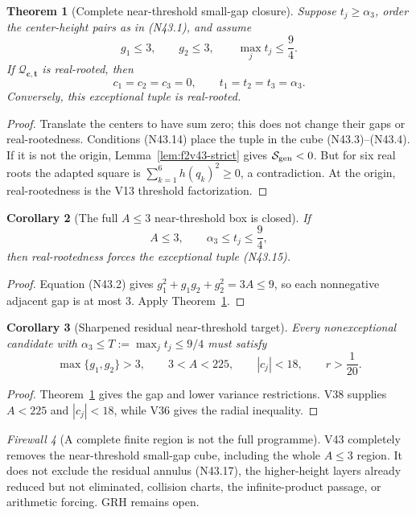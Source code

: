 \documentclass[11pt]{article}
\newtheorem{theorem}{Theorem}[section]
\newtheorem{corollary}[theorem]{Corollary}
\theoremstyle{definition}
\theoremstyle{remark}
\newtheorem{firewall}[theorem]{Firewall}
\begin{document}
\begin{theorem}[Complete near-threshold small-gap closure]
\label{thm:f2v43-gap-cube}
Suppose \(t_j\geq\alpha_3\), order the center-height pairs as in
\textup{(N43.1)}, and assume
\[
 g_1\leq3,\qquad g_2\leq3,\qquad
 \max_jt_j\leq\frac94.
\tag{N43.14}
\]
If \(\mathcal Q_{\bm c,\bm t}\) is real-rooted, then
\[
 c_1=c_2=c_3=0,\qquad
 t_1=t_2=t_3=\alpha_3.
\tag{N43.15}
\]
Conversely, this exceptional tuple is real-rooted.
\end{theorem}

\begin{proof}
Translate the centers to have sum zero; this does not change their gaps
or real-rootedness.  Conditions \textup{(N43.14)} place the tuple in the
cube \textup{(N43.3)}--\textup{(N43.4)}.  If it is not the origin,
Lemma~\ref{lem:f2v43-strict} gives
\(\mathcal S_{\rm gen}<0\).  But for six real roots the adapted square is
\(\sum_{k=1}^6h(q_k)^2\geq0\), a contradiction.  At the origin,
real-rootedness is the V13 threshold factorization.
\end{proof}

\begin{corollary}[The full \(A\leq3\) near-threshold box is closed]
\label{cor:f2v43-a3}
If
\[
 A\leq3,\qquad
 \alpha_3\leq t_j\leq\frac94,
\tag{N43.16}
\]
then real-rootedness forces the exceptional tuple
\textup{(N43.15)}.
\end{corollary}

\begin{proof}
Equation \textup{(N43.2)} gives
\(g_1^2+g_1g_2+g_2^2=3A\leq9\), so each nonnegative adjacent gap is at
most \(3\).  Apply Theorem~\ref{thm:f2v43-gap-cube}.
\end{proof}

\begin{corollary}[Sharpened residual near-threshold target]
\label{cor:f2v43-residual}
Every nonexceptional candidate with
\(\alpha_3\leq T:=\max_jt_j\leq9/4\) must satisfy
\[
 \boxed{
 \max\{g_1,g_2\}>3,\qquad
 3<A<225,\qquad
 |c_j|<18,\qquad
 r>\frac1{20}.}
\tag{N43.17}
\]
\end{corollary}

\begin{proof}
Theorem~\ref{thm:f2v43-gap-cube} gives the gap and lower variance
restrictions.  V38 supplies \(A<225\) and \(|c_j|<18\), while V36 gives
the radial inequality.
\end{proof}

\begin{firewall}[A complete finite region is not the full programme]
\label{fire:f2v43}
V43 completely removes the near-threshold small-gap cube, including the
whole \(A\leq3\) region.  It does not exclude the residual annulus
\textup{(N43.17)}, the higher-height layers already reduced but not
eliminated, collision charts, the infinite-product passage, or arithmetic
forcing.  GRH remains open.
\end{firewall}
\end{document}
